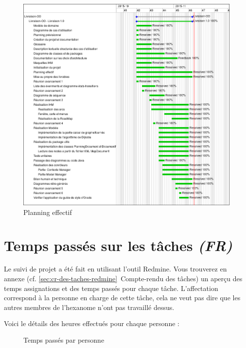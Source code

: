 \documentclass[paper=a4, fontsize=11pt]{report}
\numberwithin{equation}{section}		%
\numberwithin{figure}{section}		%
\numberwithin{table}{section}		%
\renewcommand{\it}[1]{\textit{#1}}
\begin{document}
\begin{figure}[H]
\centering
\includegraphics[scale=0.5,angle=0]{redmine/gantt-real.png}
\caption{Planning effectif}
\end{figure}

\section{Temps passés sur les tâches \it{(FR)}}
\label{sec:temps-passes-sur-les-taches}

Le suivi de projet a été fait en utilisant l'outil Redmine. Vous trouverez en annexe (cf. \ref{sec:cr-des-taches-redmine}~Compte-rendu des tâches) un aperçu des temps assignations et des temps passés pour chaque tâche. L'affectation correspond à la personne en charge de cette tâche, cela ne veut pas dire que les autres membres de l'hexanome n'ont pas travaillé dessus.

Voici le détails des heures effectués pour chaque personne :

\begin{figure}[H]
\centering
{}
\caption{Temps passés par personne}
\end{figure}
\end{document}
